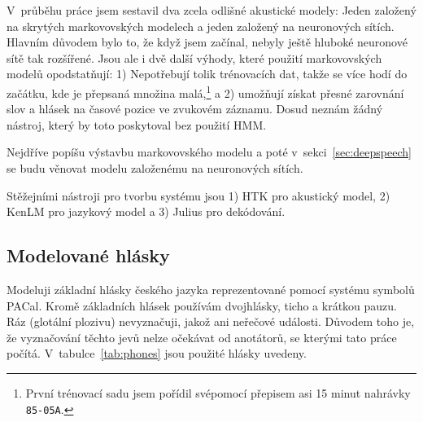 V~průběhu práce jsem sestavil dva zcela odlišné akustické modely: Jeden založený
na skrytých markovovských modelech a jeden založený na neuronových sítích.
Hlavním důvodem bylo to, že když jsem začínal, nebyly ještě hluboké neuronové
sítě tak rozšířené. Jsou ale i dvě další výhody, které použití markovovských
modelů opodstatňují: 1) Nepotřebují tolik trénovacích dat, takže se více hodí do
začátku, kde je přepsaná množina malá,\footnote{První trénovací sadu jsem pořídil svépomocí přepisem asi 15 minut nahrávky
\texttt{85-05A}.} a 2) umožňují získat přesné zarovnání
slov a hlásek na časové pozice ve zvukovém záznamu. Dosud neznám žádný nástroj,
který by toto poskytoval bez použití HMM.

Nejdříve popíšu výstavbu markovovského modelu a poté
v~sekci~\ref{sec:deepspeech} se budu věnovat modelu založenému na neuronových
sítích.



Stěžejními nástroji pro tvorbu systému jsou 1) HTK pro akustický model, 2) KenLM
pro jazykový model a 3) Julius pro dekódování.

\subsection{Modelované hlásky}
\label{ssec:ac:fonetika}

Modeluji základní hlásky českého jazyka\cite{palkova1992fonetika}
reprezentované pomocí systému symbolů PACal\cite{nouza1997phonetic}. Kromě základních hlásek
používám dvojhlásky, ticho a krátkou pauzu. Ráz (glotální plozivu) nevyznačuji,
jakož ani neřečové události. Důvodem toho je, že vyznačování těchto jevů nelze
očekávat od anotátorů, se kterými tato práce počítá.
V~tabulce~\ref{tab:phones} jsou použité hlásky uvedeny.


